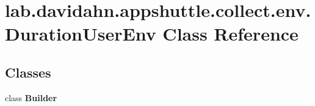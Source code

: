 \hypertarget{classlab_1_1davidahn_1_1appshuttle_1_1collect_1_1env_1_1_duration_user_env}{\section{lab.\-davidahn.\-appshuttle.\-collect.\-env.\-Duration\-User\-Env \-Class \-Reference}
\label{classlab_1_1davidahn_1_1appshuttle_1_1collect_1_1env_1_1_duration_user_env}
}
\subsection*{\-Classes}
\begin{DoxyCompactItemize}
\item 
class {\bfseries \-Builder}
\end{DoxyCompactItemize}
